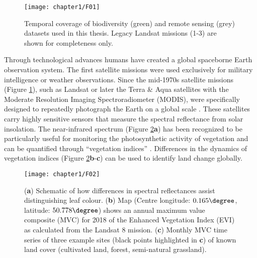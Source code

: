 \begin{figure}[htb]
\centering
\texttt{[image: chapter1/F01]}
\caption{ Temporal coverage of biodiversity (green) and remote sensing (grey) datasets used in this thesis. Legacy Landsat missions (1-3) are shown for completeness only. }
\label{F01_01}
\end{figure}

Through technological advances humans have created a global spaceborne Earth observation system. The first satellite missions were used exclusively for military intelligence or weather observations. Since the mid-1970s satellite missions (Figure \ref{F01_01}), such as Landsat or later the Terra \& Aqua satellites with the Moderate Resolution Imaging Spectroradiometer (MODIS), were specifically designed to repeatedly photograph the Earth on a global scale \citep{Schaaf2002,Zhang2006,Kennedy2014}. These satellites carry highly sensitive sensors that measure the spectral reflectance from solar insolation. The near-infrared spectrum (Figure \ref{F01_02}\textbf{a}) has been recognized to be particularly useful for monitoring the photosynthetic activity of vegetation and can be quantified through “vegetation indices” \citep{Tucker1979,Tucker1981,Pettorelli2005,Jiang2008}. Differences in the dynamics of vegetation indices (Figure \ref{F01_02}\textbf{b}-\textbf{c}) can be used to identify land change globally. 

\begin{figure}[htb]
\centering
\texttt{[image: chapter1/F02]}
\caption{ (\textbf{a}) Schematic of how differences in spectral reflectances assist distinguishing leaf colour. (\textbf{b}) Map (Centre longitude: $0.165\degree$, latitude: $50.778\degree$) shows an annual maximum value composite (MVC) for 2018 of the Enhanced Vegetation Index (EVI) as calculated from the Landsat 8 mission. (\textbf{c}) Monthly MVC time series of three example sites (black points highlighted in \textbf{c}) of known land cover (cultivated land, forest, semi-natural grassland). }
\label{F01_02}
\end{figure}

